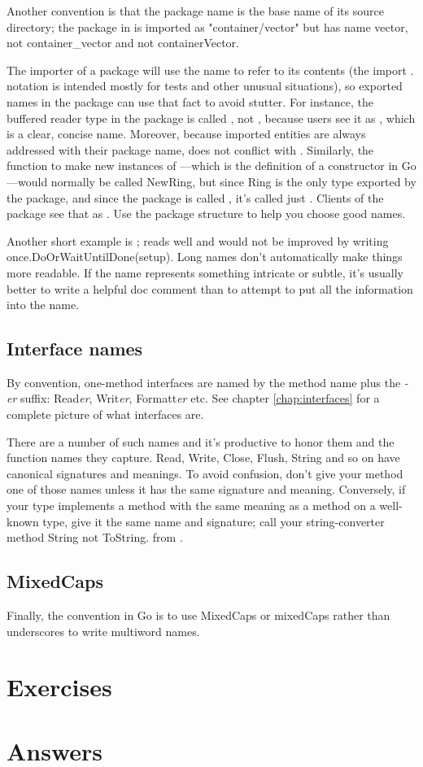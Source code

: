 Another convention is that the package name is the base name of its
source directory; the package in  is imported as
"container/vector" but has name vector, not container\_vector and not
containerVector.

The importer of a package will use the name to refer to its contents
(the import . notation is intended mostly for tests and other unusual
situations), so exported names in the package can use that fact to avoid
stutter. For instance, the buffered reader type in the  package is
called , not , because users see it as
,
which is a clear, concise name. Moreover, because imported entities are
always addressed with their package name,  does not conflict
with . Similarly, the function to make new instances of
—which is the definition of a constructor in Go—would normally
be called NewRing, but since Ring is the only type exported by the
package, and since the package is called , it's called
just .
Clients of the package see that as . Use the package structure
to help you choose good names.

Another short example is ;  reads well and would
not be improved by writing once.DoOrWaitUntilDone(setup). Long names
don't automatically make things more readable. If the name represents
something intricate or subtle, it's usually better to write a helpful
doc comment than to attempt to put all the information into the name.

\subsection{Interface names}
By convention, one-method interfaces are named by the method name plus
the \emph{-er} suffix: Read\emph{er}, Writ\emph{er}, Formatt\emph{er} etc. See chapter
\ref{chap:interfaces} for a complete picture of what interfaces are.

There are a number of such names and it's productive to honor them and
the function names they capture. Read, Write, Close, Flush, String and
so on have canonical signatures and meanings. To avoid confusion, don't
give your method one of those names unless it has the same signature and
meaning. Conversely, if your type implements a method with the same
meaning as a method on a well-known type, give it the same name and
signature; call your string-converter method String not ToString.
from \cite{effective_go}.

\subsection{MixedCaps}
Finally, the convention in Go is to use MixedCaps or mixedCaps rather
than underscores to write multiword names.

\section{Exercises}




\cleardoublepage
\section{Answers}
\shipoutAnswer
